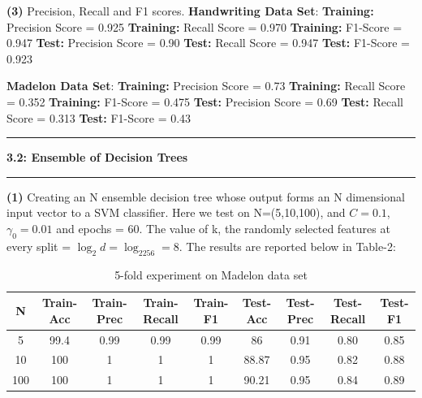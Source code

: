 \documentclass{article}
\newcommand\question[2]{\vspace{.25in}\hrule\textbf{#1: #2}\hrule\vspace{.10in}}
\renewcommand\part[1]{\vspace{.10in}\textbf{(#1)}}
\begin{document}
  \part{3} Precision, Recall and F1 scores.\newline
  \textbf {Handwriting Data Set}: \newline
  \textbf {Training:} Precision Score = 0.925 \newline
  \textbf {Training:} Recall Score = 0.970 \newline
  \textbf {Training:} F1-Score = 0.947 \newline
  \textbf {Test:} Precision Score = 0.90 \newline
  \textbf {Test:} Recall Score = 0.947 \newline
  \textbf {Test:} F1-Score = 0.923 \newline

  \textbf {Madelon Data Set}: \newline
  \textbf {Training:} Precision Score = 0.73 \newline
  \textbf {Training:} Recall Score = 0.352 \newline
  \textbf {Training:} F1-Score = 0.475 \newline
  \textbf {Test:} Precision Score = 0.69 \newline
  \textbf {Test:} Recall Score = 0.313 \newline
  \textbf {Test:} F1-Score = 0.43 \newline

  \question{3.2}{Ensemble of Decision Trees}
  \part{1} Creating an N ensemble decision tree whose output forms an N dimensional input vector to a SVM classifier. Here we test on N=(5,10,100), and $C = 0.1$, $\gamma_0 = 0.01$ and epochs = 60. The value of k, the randomly selected features at every split = $\log_2d = \log_2256 = 8$. The results are reported below in Table-2: \newline

 \begin{longtable}{c|c|c|c|c|c|c|c|c}
  \caption{5-fold experiment on Madelon data set} \\
  \hline\hline
	  N & Train-Acc & Train-Prec & Train-Recall & Train-F1 & Test-Acc & Test-Prec & Test-Recall & Test-F1 \\[0.5ex]

  \hline
	 5 & 99.4 & 0.99 & 0.99 & 0.99 & 86 & 0.91 & 0.80 & 0.85 \\
	 10 & 100 & 1 & 1 & 1 & 88.87 & 0.95 & 0.82 & 0.88 \\
	 100 & 100 & 1 & 1 & 1 & 90.21 & 0.95 & 0.84 & 0.89 \\ [0.5ex]
  \end{longtable}
\end{document}
